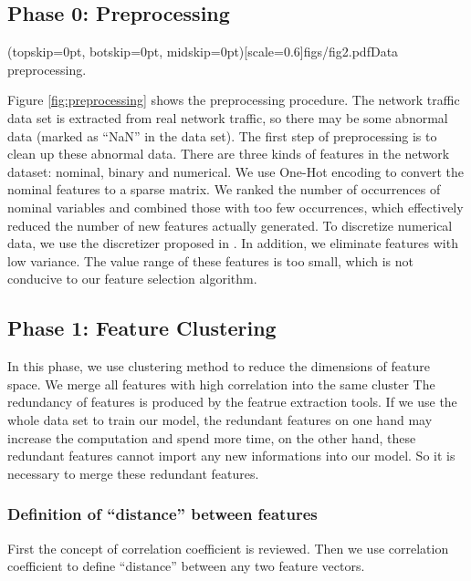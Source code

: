 \documentclass{ieeeaccess}
\theoremstyle{definition}
\begin{document}
\subsection{Phase 0: Preprocessing}

\Figure[!htpb](topskip=0pt, botskip=0pt, midskip=0pt)[scale=0.6]{figs/fig2.pdf}{Data preprocessing. \label{fig:preprocessing}}

Figure \ref{fig:preprocessing} shows the preprocessing procedure. The network traffic data set is extracted from real network traffic, so there may be some abnormal data (marked as ``NaN'' in the data set). The first step of preprocessing is to clean up these abnormal data. There are three kinds of features in the network dataset: nominal, binary and numerical. 
We use One-Hot encoding to convert the nominal features to a sparse matrix. We ranked the number of occurrences of nominal variables and combined those with too few occurrences, which effectively reduced the number of new features actually generated. 
To discretize numerical data, we use the discretizer proposed in \cite{Mazumder2012}. 
In addition, we eliminate features with low variance. The value range of these features is too small, which is not conducive to our feature selection algorithm.

\subsection{Phase 1: Feature Clustering}

In this phase, we use clustering method to reduce the dimensions of feature space. 
We merge all features with high correlation into the same cluster
The redundancy of features is produced by the featrue extraction tools. 
If we use the whole data set to train our model, the redundant features on one hand may increase the computation and spend more time, on the other hand, these redundant features cannot import any new informations into our model. 
So it is necessary to merge these redundant features. 

\subsubsection{Definition of ``distance'' between features}

First the concept of correlation coefficient is reviewed. Then we use correlation coefficient to define ``distance'' between any two feature vectors. 
\end{document}
